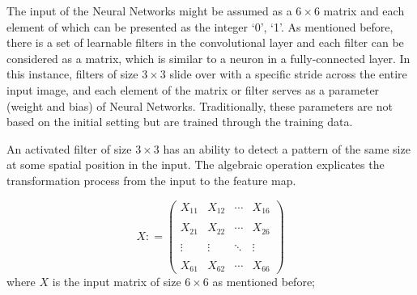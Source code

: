 \documentclass[]{krantz}
\begin{document}
The input of the Neural Networks might be assumed as a \(6\times6\) matrix and each element of which can be presented as the integer `0', `1'. As mentioned before, there is a set of learnable filters in the convolutional layer and each filter can be considered as a matrix, which is similar to a neuron in a fully-connected layer. In this instance, filters of size \(3 \times 3\) slide over with a specific stride across the entire input image, and each element of the matrix or filter serves as a parameter (weight and bias) of Neural Networks. Traditionally, these parameters are not based on the initial setting but are trained through the training data.

An activated filter of size \(3 \times 3\) has an ability to detect a pattern of the same size at some spatial position in the input. The algebraic operation explicates the transformation process from the input to the feature map.

\[ X  : = \begin{pmatrix}
X_{11} & X_{12} & \cdots & X_{16}\\ \\
X_{21} & X_{22} & \cdots &X_{26} \\ \\
\vdots & \vdots & \ddots & \vdots \\ \\
X_{61} & X_{62} & \cdots & X_{66}
\end{pmatrix}\]
where \(X\) is the input matrix of size \(6 \times 6\) as mentioned before;
\end{document}
